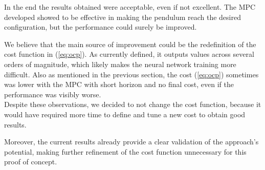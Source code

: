 In the end the results obtained were acceptable, even if not excellent. The MPC developed showed to be effective in making the pendulum reach the desired configuration, but the performance could surely be improved.


\noindent We believe that the main source of improvement could be the redefinition of the cost function in (\ref{eq:ocp}). As currently defined, it outputs values across several orders of magnitude, which likely makes the neural network training more difficult. Also as mentioned in the previous section, the cost (\ref{eq:ocp}) sometimes was lower with the MPC with short horizon and no final cost, even if the performance was visibly worse.\\

\noindent Despite these observations, we decided to not change the cost function, because it would have required more time to define and tune a new cost to obtain good results. 

\noindent Moreover, the current results already provide a clear validation of the approach's potential, making further refinement of the cost function unnecessary for this proof of concept.
